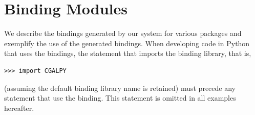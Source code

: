 \section{Binding Modules}
\label{sec:modules}
We describe the bindings generated by our system for various \cgal{}
packages and exemplify the use of the generated bindings.
%
When developing code in Python that uses the bindings, the statement
that imports the binding library, that is,
\begin{lstlisting}[style=pythonStyle]
>>> import CGALPY
\end{lstlisting}
(assuming the default binding library name is retained) must precede
any statement that use the binding. This statement is omitted in all
examples hereafter.


